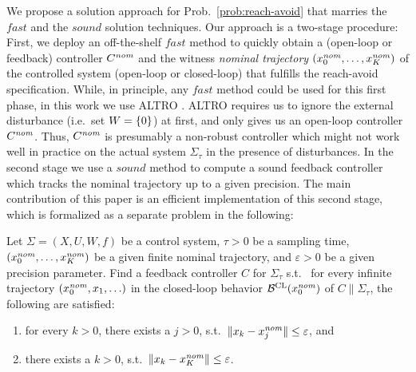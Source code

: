 We propose a solution approach for Prob.~\ref{prob:reach-avoid} that marries the $\mathit{fast}$ and the $\mathit{sound}$ solution techniques.
Our approach is a two-stage procedure: 
First, we deploy an off-the-shelf $\mathit{fast}$ method to quickly obtain a (open-loop or feedback) controller $C^{\mathit{nom}}$ and the witness \emph{nominal trajectory} $(x_0^{\mathit{nom}},\ldots,x_K^{\mathit{nom}})$ of the controlled system (open-loop or closed-loop) that fulfills the reach-avoid specification.
While, in principle, any $\mathit{fast}$ method could be used for this first phase, in this work we use ALTRO \cite{howell2019altro}.
ALTRO requires us to ignore the external disturbance (i.e.\ set $W=\{ 0 \}$) at first, and only gives us an open-loop controller $C^{\mathit{nom}}$.
Thus, $C^{\mathit{nom}}$ is presumably a non-robust controller which might not work well in practice on the actual system $\Sigma_\tau$ in the presence of disturbances.
In the second stage we use a $\mathit{sound}$ method to compute a sound feedback controller which tracks the nominal trajectory up to a given precision.
The main contribution of this paper is an efficient implementation of this second stage, which is formalized as a separate problem in the following:

\begin{problem}\label{prob:tracking}
	Let $\Sigma=(X,U,W,f)$ be a control system, $\tau>0$ be a sampling time, $(x_0^{\mathit{nom}},\ldots,x_K^{\mathit{nom}})$ be a given finite nominal trajectory, and $\varepsilon>0$ be a given precision parameter.
	Find a feedback controller $C$ for $\Sigma_\tau$ s.t.\ 
	for every infinite trajectory $(x_0^{\mathit{nom}},x_1,\ldots)$ in the closed-loop behavior $\mathcal{B}^{\mathrm{CL}}(x_0^{\mathit{nom}})$ of $C \parallel \Sigma_\tau$, the following are satisfied:
	\begin{enumerate}
		\item for every $k > 0$, there exists a $j>0$, s.t.\ $\| x_k-x_j^{\mathit{nom}} \| \leq \varepsilon$, and
		\item there exists a $k>0$, s.t.\ $\| x_k-x_K^{\mathit{nom}} \|\leq \varepsilon$.
	\end{enumerate} 
\end{problem}


